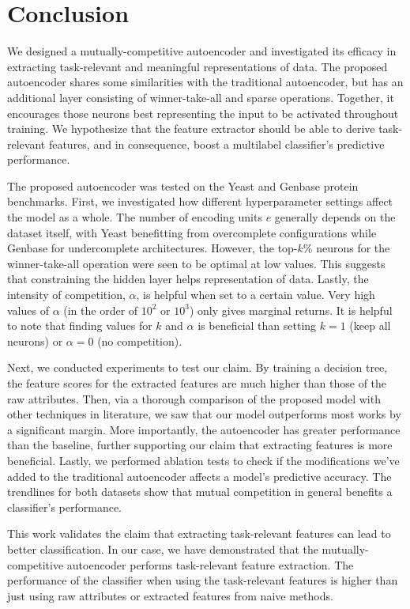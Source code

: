 \section{Conclusion}
\label{MCConclusions}

\par We designed a mutually-competitive autoencoder and investigated its
efficacy in extracting task-relevant and meaningful representations of data.
The proposed autoencoder shares some similarities with the traditional
autoencoder, but has an additional layer consisting of winner-take-all and
sparse operations. Together, it encourages those neurons best representing
the input to be activated throughout training. We hypothesize that the
feature extractor should be able to derive task-relevant features, and in
consequence, boost a multilabel classifier's predictive performance.

\par The proposed autoencoder was tested on the Yeast and Genbase protein
benchmarks. First, we investigated how different hyperparameter settings
affect the model as a whole. The number of encoding units $e$ generally
depends on the dataset itself, with Yeast benefitting from overcomplete
configurations while Genbase for undercomplete architectures. However, the
top-$k\%$ neurons for the winner-take-all operation were seen to be optimal
at low values. This suggests that constraining the hidden layer helps
representation of data. Lastly, the intensity of competition, $\alpha$, is
helpful when set to a certain value. Very high values of $\alpha$ (in the
order of $10^{2}$ or $10^{3}$) only gives marginal returns. It is helpful to
note that finding values for $k$ and $\alpha$ is beneficial than setting
$k=1$ (keep all neurons) or $\alpha=0$ (no competition).

\par Next, we conducted experiments to test our claim. By training a decision
tree, the feature scores for the extracted features are much higher than
those of the raw attributes. Then, via a thorough comparison of the proposed
model with other techniques in literature, we saw that our model outperforms
most works by a significant margin. More importantly, the autoencoder has
greater performance than the baseline, further supporting our claim that
extracting features is more beneficial. Lastly, we performed ablation tests
to check if the modifications we've added to the traditional autoencoder
affects a model's predictive accuracy. The trendlines for both datasets show
that mutual competition in general benefits a classifier's performance.

\par This work validates the claim that extracting task-relevant features can
lead to better classification. In our case, we have demonstrated that the
mutually-competitive autoencoder performs task-relevant feature extraction.
The performance of the classifier when using the task-relevant features is
higher than just using raw attributes or extracted features from naive
methods.